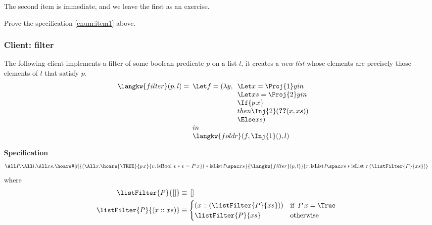 The second item is immediate, and we leave the first as an exercise.
\begin{exercise}
Prove the specification \eqref{enum:item1} above.
\end{exercise}



\subsubsection*{Client: filter}
The following client implements a filter of some boolean predicate $p$ on a list $l$, \ie{} it creates a \emph{new list} whose elements are precisely those elements of $l$ that satisfy $p$.
\begin{displaymath}
    {\langkw{filter} (p, l) =}
    \begin{array}[t]{l}
      \Let f = (\lambda y, \begin{array}[t]{l}
                             \Let x = \Proj{1}  y in\\
                             \Let xs = \Proj{2} y  in\\
                             \If {p\, x} \\
                             then \Inj{2} (\Ref (x, xs) ) \\
                             \Else  xs
                             )
                           \end{array}\\
      in \\
      \langkw{foldr}(f, \Inj{1}(), l)
    \end{array}
  \end{displaymath}
  
 \noindent \textbf{Specification}
\begin{align*}
\All P. \All l. \All xs. 
\hoareV[t]{ \left( \All x. \hoare{\TRUE}{p \, x}{v. \operatorname{isBool} \, v \ast v = P \, x}\right)
\ast \isList {l} {xs} }{\langkw{filter}(p, l)}{r.  \isList {l} {xs} \ast \operatorname{isList} \, r \left( \listFilter {P} {xs} \right)}
\end{align*}
where
\begin{align*}
\listFilter {P} {[]} &\equiv \, [] \\
\listFilter {P} {(x :: xs)} &\equiv \begin{cases} \left( x :: \left( \listFilter {P} {xs} \right) \right)
													  & \text{if } \, P \, x = \True  \\
\listFilter {P} {xs}  & \text{otherwise } \end{cases}
\end{align*}


